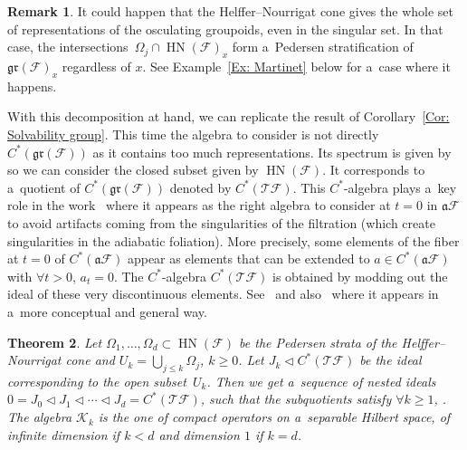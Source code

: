 \documentclass[pdftex]{sigma}
\newcommand{\CCC}{\mathscr{C}} %
\newcommand{\F}{\mathcal{F}} %
\newcommand{\T}{\mathcal{T}} %
\newcommand{\HN}{\operatorname{HN}} %
\newcommand{\Fb}{\mathcal{F}} %
\newcommand{\gr}{\mathfrak{gr}} %
\numberwithin{equation}{section}
\newtheorem{thm}{Theorem}[section]
\theoremstyle{definition}
\newtheorem{rem}[thm]{Remark}
\begin{document}
\begin{rem}
 It could happen that the Helffer--Nourrigat cone gives the whole set of representations of the osculating groupoids, even in the singular set. In that case, the intersections~${\Omega_j\cap \HN(\F)_x}$ form a~Pedersen stratification of $\gr(\Fb)_x$ regardless of $x$. See Example~\ref{Ex: Martinet} below for a~case where it happens.
\end{rem}

With this decomposition at hand, we can replicate the result of Corollary~\ref{Cor: Solvability group}. This time the algebra to consider is not directly $C^*(\gr(\Fb))$ as it contains too much representations. Its spectrum is given by \smash{$\widehat{\gr(\Fb)}$} so we can consider the closed subset given by $\HN(\Fb)$. It corresponds to a~quotient of $C^*(\gr(\Fb))$ denoted by $C^*(\T\F)$. This $C^*$-algebra plays a~key role in the work~\cite{AMYMaximalHypoellipticity} where it appears as the right algebra to consider at $t = 0$ in $\mathfrak{a}\F$ to avoid artifacts coming from the singularities of the filtration (which create singularities in the adiabatic foliation). More precisely, some elements of the fiber at $t = 0$ of $C^*(\mathfrak{a}\Fb)$ appear as elements that can be extended to $a \in C^*(\mathfrak{a}\Fb)$ with $\forall t> 0$, $a_t =0$. The $C^*$-algebra $C^*(\T\F)$ is obtained by modding out the ideal of these very discontinuous elements. See~\cite[Theorem 2.20]{AMYMaximalHypoellipticity} and also~\cite{MohsenBlowupFoliation} where it appears in a~more conceptual and general way.

\begin{thm}\label{Theorem:SolvabilityCTF}
 Let $\Omega_1,\dots,\Omega_d\subset \HN(\Fb)$ be the Pedersen strata of the Helffer--Nourrigat cone and $U_k = \bigcup_{j\leq k} \Omega_j$, $k\geq 0$.
 Let $J_k \triangleleft C^*(\T\F)$ be the ideal corresponding to the open subset~$U_k$. Then we get a~sequence of nested ideals $0 = J_0 \triangleleft J_1 \triangleleft \cdots \triangleleft J_d = C^*(\T\F)$,
 such that the subquotients satisfy $\forall k \geq 1$, \smash{${J_k}/{J_{k-1}} \cong \CCC_0(\Omega_k,\mathcal{K}_k)$}.
 The algebra $\mathcal{K}_k$ is the one of compact operators on a~separable Hilbert space, of infinite dimension if $k < d$ and dimension $1$ if $k = d$.
\end{thm}
\end{document}
